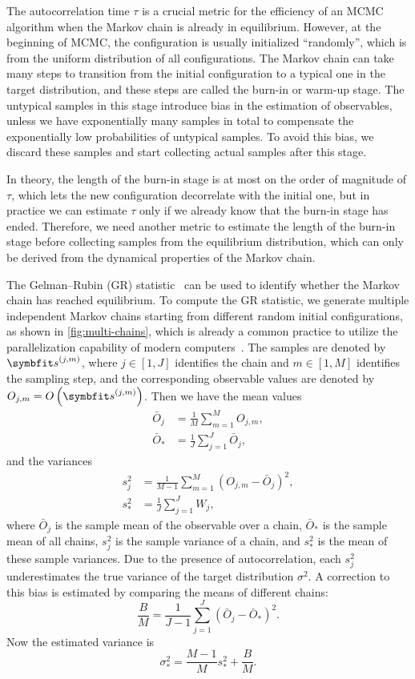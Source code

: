 The autocorrelation time $\tau$ is a crucial metric for the efficiency of an MCMC algorithm when the Markov chain is already in equilibrium. However, at the beginning of MCMC, the configuration is usually initialized ``randomly'', which is from the uniform distribution of all configurations. The Markov chain can take many steps to transition from the initial configuration to a typical one in the target distribution, and these steps are called the burn-in or warm-up stage. The untypical samples in this stage introduce bias in the estimation of observables, unless we have exponentially many samples in total to compensate the exponentially low probabilities of untypical samples. To avoid this bias, we discard these samples and start collecting actual samples after this stage.

In theory, the length of the burn-in stage is at most on the order of magnitude of $\tau$, which lets the new configuration decorrelate with the initial one, but in practice we can estimate $\tau$ only if we already know that the burn-in stage has ended. Therefore, we need another metric to estimate the length of the burn-in stage before collecting samples from the equilibrium distribution, which can only be derived from the dynamical properties of the Markov chain.

The Gelman--Rubin (GR) statistic~\cite{gelman1992inference, vats2021revisiting} can be used to identify whether the Markov chain has reached equilibrium. To compute the GR statistic, we generate multiple independent Markov chains starting from different random initial configurations, as shown in \cref{fig:multi-chains}, which is already a common practice to utilize the parallelization capability of modern computers~\cite{lee2010utility}. The samples are denoted by $\vs^{(j, m)}$, where $j \in [1, J]$ identifies the chain and $m \in [1, M]$ identifies the sampling step, and the corresponding observable values are denoted by $O_{j, m} = O\left( \vs^{(j, m)} \right)$. Then we have the mean values
\begin{align}
\bar{O}_j &= \frac{1}{M} \sum_{m = 1}^M O_{j, m}, \\
\bar{O}_* &= \frac{1}{J} \sum_{j = 1}^J \bar{O}_j,
\end{align}
and the variances
\begin{align}
s^2_j &= \frac{1}{M - 1} \sum_{m = 1}^M (O_{j, m} - \bar{O}_j)^2, \\
s^2_* &= \frac{1}{J} \sum_{j = 1}^J W_j,
\end{align}
where $\bar{O}_j$ is the sample mean of the observable over a chain, $\bar{O}_*$ is the sample mean of all chains, $s^2_j$ is the sample variance of a chain, and $s^2_*$ is the mean of these sample variances. Due to the presence of autocorrelation, each $s^2_j$ underestimates the true variance of the target distribution $\sigma^2$. A correction to this bias is estimated by comparing the means of different chains:
\begin{equation}
\frac{B}{M} = \frac{1}{J - 1} \sum_{j = 1}^J (\bar{O}_j - \bar{O}_*)^2.
\end{equation}
Now the estimated variance is
\begin{equation}
\sigma^2_* = \frac{M - 1}{M} s^2_* + \frac{B}{M}.
\end{equation}

